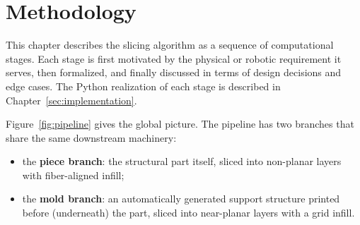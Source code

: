 \section{Methodology}\label{sec:methodology}

This chapter describes the slicing algorithm as a sequence of
computational stages. Each stage is first motivated by the physical or
robotic requirement it serves, then formalized, and finally discussed
in terms of design decisions and edge cases. The Python realization of
each stage is described in Chapter~\ref{sec:implementation}.

Figure~\ref{fig:pipeline} gives the global picture. The pipeline has two
branches that share the same downstream machinery:

\begin{itemize}
  \item the \textbf{piece branch}: the structural part itself, sliced
        into non-planar layers with fiber-aligned infill;
  \item the \textbf{mold branch}: an automatically generated support
        structure printed before (underneath) the part, sliced into
        near-planar layers with a grid infill.
\end{itemize}

